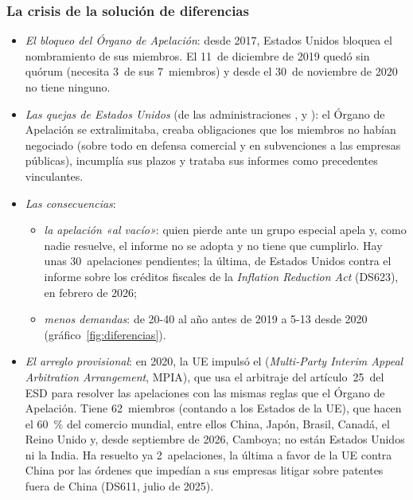 \documentclass[11pt]{article}
\begin{document}
\subsubsection{La crisis de la solución de diferencias}\label{sec:crisis-osd}

\begin{itemize}
\item \emph{El bloqueo del Órgano de Apelación}: desde 2017, Estados Unidos bloquea el nombramiento de sus miembros. El 11~de diciembre de 2019 quedó sin quórum (necesita 3~de sus 7~miembros) y desde el 30~de noviembre de 2020 no tiene ninguno.
\item \emph{Las quejas de Estados Unidos} (de las administraciones ,  y ): el Órgano de Apelación se extralimitaba, creaba obligaciones que los miembros no habían negociado (sobre todo en defensa comercial y en subvenciones a las empresas públicas), incumplía sus plazos y trataba sus informes como precedentes vinculantes.
\item \emph{Las consecuencias}:
  \begin{itemize}
  \item \emph{la apelación «al vacío»}: quien pierde ante un grupo especial apela y, como nadie resuelve, el informe no se adopta y no tiene que cumplirlo. Hay unas 30~apelaciones pendientes; la última, de Estados Unidos contra el informe sobre los créditos fiscales de la \emph{Inflation Reduction Act} (DS623), en febrero de 2026\nocite{OMC2026DS623};
  \item \emph{menos demandas}: de 20-40 al año antes de 2019 a 5-13 desde 2020 (gráfico~\ref{fig:diferencias}).
  \end{itemize}
\item \emph{El arreglo provisional}: en 2020, la UE impulsó el  (\emph{Multi-Party Interim Appeal Arbitration Arrangement}, MPIA), que usa el arbitraje del artículo~25~del ESD para resolver las apelaciones con las mismas reglas que el Órgano de Apelación. Tiene 62~miembros (contando a los Estados de la UE), que hacen el 60~\% del comercio mundial, entre ellos China, Japón, Brasil, Canadá, el Reino Unido y, desde septiembre de 2026, Camboya; no están Estados Unidos ni la India\nocite{CE2026MPIA}. Ha resuelto ya 2~apelaciones, la última a favor de la UE contra China por las órdenes que impedían a sus empresas litigar sobre patentes fuera de China (DS611, julio de 2025)\nocite{OMC2025DS611}.
\end{itemize}
\end{document}
